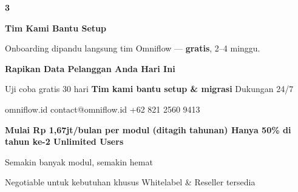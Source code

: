 \documentclass[a4paper]{article}
\begin{document}
\begin{center}
\begin{minipage}[t]{0.318\textwidth}
{\begin{minipage}[t][4.7cm][c]{\dimexpr\linewidth-2\fboxsep\relax}
            \begin{center}{\fontsize{22}{26}\selectfont\bfseries\color{BluePrimary} 3}\end{center}
            \vspace{2pt}
            \begin{center}
                {\fontsize{10}{13}\selectfont\bfseries\color{BlueDark} Tim Kami Bantu Setup}\par\vspace{3pt}
                {\fontsize{9}{12}\selectfont\color{TextDark} Onboarding dipandu langsung tim Omniflow --- \textbf{gratis}, 2--4 minggu.}
            \end{center}
        \end{minipage}}
\end{minipage}
\end{center}

\vspace{8pt}

{\setlength{\fboxsep}{10pt}\setlength{\fboxrule}{0pt}%
\noindent\colorbox{BluePrimary}{%
    \begin{minipage}{\dimexpr\textwidth-2\fboxsep\relax}
        \centering
        {\fontsize{13}{16}\selectfont\bfseries\color{White} Rapikan Data Pelanggan Anda Hari Ini}\par\vspace{3pt}
        {\fontsize{9.5}{12}\selectfont\color{BlueMid} Uji coba gratis 30 hari \enspace\textbullet\enspace \textbf{Tim kami bantu setup \& migrasi} \enspace\textbullet\enspace Dukungan 24/7}\par\vspace{2pt}
        {\fontsize{9.5}{12}\selectfont\color{BlueLight} omniflow.id \enspace\textbullet\enspace contact@omniflow.id \enspace\textbullet\enspace +62 821 2560 9413}
    \end{minipage}}}


\vspace{6pt}

{\setlength{\fboxsep}{8pt}\setlength{\fboxrule}{0pt}%
\noindent\colorbox{BlueBg}{%
    \begin{minipage}{\dimexpr\textwidth-2\fboxsep\relax}
        \centering
        {\fontsize{9}{12}\selectfont\bfseries\color{BluePrimary}
        Mulai Rp 1,67jt/bulan per modul (ditagih tahunan) \enspace\textbullet\enspace Hanya 50\% di tahun ke-2 \enspace\textbullet\enspace Unlimited Users}\par\vspace{1pt}
        {\fontsize{8.5}{11}\selectfont\color{BlueDark}
        Semakin banyak modul, semakin hemat}\par\vspace{1pt}
        {\fontsize{8}{10}\selectfont\color{TextLight}
        Negotiable untuk kebutuhan khusus \enspace\textbullet\enspace Whitelabel \& Reseller tersedia}
    \end{minipage}}}

\restoregeometry
\pagestyle{empty}
\end{document}
